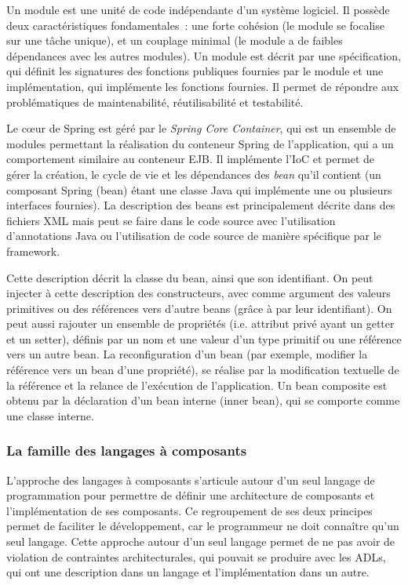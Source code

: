     Un module est une unité de code indépendante d'un système logiciel. Il possède deux caractéristiques fondamentales~:  une forte cohésion (le module se focalise sur une tâche unique), et un couplage minimal (le module a de faibles dépendances avec les autres modules). Un module est décrit par une spécification, qui définit les signatures des fonctions publiques fournies par le module et une implémentation, qui implémente les fonctions fournies. Il permet de répondre aux problématiques de maintenabilité, réutilisabilité et testabilité. 
    
    Le cœur de Spring est géré par le \emph{Spring Core Container}, qui est un ensemble de modules permettant la réalisation du conteneur Spring de l'application, qui a un comportement similaire au conteneur EJB. Il implémente l'IoC et permet de gérer la création, le cycle de vie et les dépendances des \emph{bean} qu'il contient (un composant Spring (bean) étant une classe Java qui implémente une ou plusieurs interfaces fournies). La description des beans est principalement décrite dans des fichiers XML mais peut se faire dans le code source avec l'utilisation d'annotations Java ou l'utilisation de code source de manière spécifique par le framework.
    
    Cette description décrit la classe du bean, ainsi que son identifiant. On peut injecter à cette description des constructeurs, avec comme argument des valeurs primitives ou des références vers d'autre beans (grâce à par leur identifiant). On peut aussi rajouter un ensemble de propriétés (i.e. attribut privé ayant un getter et un setter), définis par un nom et une valeur d'un type primitif ou une référence vers un autre bean. La reconfiguration d'un bean (par exemple, modifier la référence vers un bean d'une propriété), se réalise par la modification textuelle de la référence et la relance de l'exécution de l'application. Un bean composite est obtenu par la déclaration d'un bean interne (inner bean), qui se comporte comme une classe interne. \\\par 
             
    \subsubsection{La famille des langages à composants}
    
    \label{sec:presentcomponent}
    
    L'approche des langages à composants s'articule autour d'un seul langage de programmation pour permettre de définir une architecture de composants et l'implémen\-ta\-tion de ses composants. Ce regroupement de ses deux principes permet de faciliter le développement, car le programmeur ne doit connaître qu'un seul langage.  
    Cette approche autour d'un seul langage permet de ne pas avoir de violation de contraintes architecturales, qui pouvait se produire avec les ADLs, qui ont une description dans un langage et l'implémentation dans un autre.\\\par 
    
